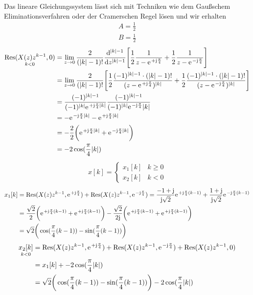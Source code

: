 Das lineare Gleichungssystem lässt sich mit Techniken wie dem Gaußschem Eliminationsverfahren oder der Cramerschen Regel lösen und wir erhalten
\begin{align}
	A=\frac{1}{2} \nonumber \\
	B=\frac{1}{2}
\end{align}
\begin{align}
	\underset{k<0}{\mathrm{Res}(X(z)z^{k-1},0)}&=\lim\limits_{z\rightarrow0}\frac{2}{(|k|-1)!}\frac{\mathrm{d}^{|k|-1}}{\mathrm{d}z^{|k|-1}}\Bigg[\frac{1}{2}\frac{1}{z-\e^{+\im\frac{\pi}{4}}}+\frac{1}{2}\frac{1}{z-\e^{-\im\frac{\pi}{4}}}\Bigg]\nonumber\\
	&=\lim\limits_{z\rightarrow0}\frac{2}{(|k|-1)!}\Bigg[\frac{1}{2}\frac{(-1)^{|k|-1}\cdot(|k|-1)!}{(z-\e^{+\im\frac{\pi}{4}})^{|k|}}+\frac{1}{2}\frac{(-1)^{|k|-1}\cdot(|k|-1)!}{(z-\e^{-\im\frac{\pi}{4}})^{|k|}}\Bigg]\nonumber\\
	&=\frac{(-1)^{|k|-1}}{(-1)^{|k|}\e^{+\im\frac{\pi}{4}|k|}}\frac{(-1)^{|k|-1}}{(-1)^{|k|}\e^{-\im\frac{\pi}{4}}|k|}\nonumber\\
	&=-\e^{-\im\frac{\pi}{4}|k|}-\e^{+\im\frac{\pi}{4}|k|}\nonumber\\
	&=-\frac{2}{2}\bigg(\e^{+\im\frac{\pi}{4}|k|}+\e^{-\im\frac{\pi}{4}|k|}\bigg)\nonumber\\
	&=-2\cos(\frac{\pi}{4}|k|)
\end{align}
\begin{align}
	x[k]=\begin{cases}
		x_1[k] &k\geq0 \\
		x_2[k] &k<0
	\end{cases}
\end{align}
\begin{align}
	x_1[k]&=\mathrm{Res}(X(z)z^{k-1},\e^{+\im\frac{\pi}{4}})+\mathrm{Res}(X(z)z^{k-1},\e^{-\im\frac{\pi}{4}})=\frac{-1+\im}{\im\sqrt{2}}\e^{+\im\frac{\pi}{4}(k-1)}+\frac{1+\im}{\im\sqrt{2}}\e^{-\im\frac{\pi}{4}(k-1)}\nonumber\\
	&=\frac{\sqrt{2}}{2}\bigg (\e^{+\im\frac{\pi}{4}(k-1)}+\e^{+\im\frac{\pi}{4}(k-1)}\bigg )-\frac{\sqrt{2}}{2\im} \bigg (\e^{+\im\frac{\pi}{4}(k-1)}+\e^{+\im\frac{\pi}{4}(k-1)}\bigg)\nonumber\\
	&=\sqrt{2}\bigg(\cos(\frac{\pi}{4}(k-1))-\sin(\frac{\pi}{4}(k-1))\bigg)
\end{align}
\begin{align}
	\underset{k<0}{x_2[k]}&=\mathrm{Res}(X(z)z^{k-1},\e^{+\im\frac{\pi}{4}})+\mathrm{Res}(X(z)z^{k-1},\e^{-\im\frac{\pi}{4}})+\mathrm{Res}(X(z)z^{k-1},0)\nonumber\\
	&=x_1[k]+-2\cos(\frac{\pi}{4}|k|) \nonumber\\
	&=\sqrt{2}\bigg(\cos(\frac{\pi}{4}(k-1))-\sin(\frac{\pi}{4}(k-1))\bigg)-2\cos(\frac{\pi}{4}|k|)
\end{align}
